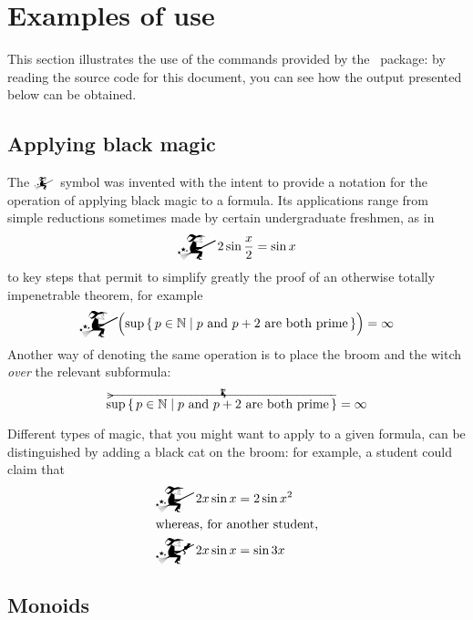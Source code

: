 \documentclass[a4paper]{article}
\newcommand*{\halloweenmath}{\packlass{halloweenmath}}
\begin{document}
\clearpage

\section{Examples of use}
\label{S:Example}

This section illustrates the use of the commands provided by the \halloweenmath\
package: by reading the source code for this document, you can see how the
output presented below can be obtained.



\subsection{Applying black magic}

The $\mathwitch$~symbol was invented with the intent to provide a notation for
the operation of applying black magic to a formula.  Its applications range from
simple reductions sometimes made by certain undergraduate freshmen, as in
\[
	\mathwitch 2\sin\frac{x}{2} = \sin x
\]
to key steps that permit to simplify greatly the proof of an otherwise totally
impenetrable theorem, for example
\[
	\mathwitch\Bigl(
		\sup\,\{\,p\in\mathbb{N}\mid \text{$p$ and $p+2$ are both prime}\,\}
	\Bigr) = \infty
\]
Another way of denoting the same operation is to place the broom and the witch
\emph{over} the relevant subformula:
\[
	\overrightwitchonbroom{
		\sup\,\{\,p\in\mathbb{N}\mid \text{$p$ and $p+2$ are both prime}\,\}
	} = \infty
\]

Different types of magic, that you might want to apply to a given formula, can
be distinguished by adding a black cat on the broom: for example, a student
could claim that
\begin{align*}
	\mathwitch 2x\sin x &= 2\sin x^{2}\\
	\intertext{whereas, for another student,}
	\mathwitch*2x\sin x &= \sin 3x
\end{align*}



\subsection{Monoids}
\end{document}
